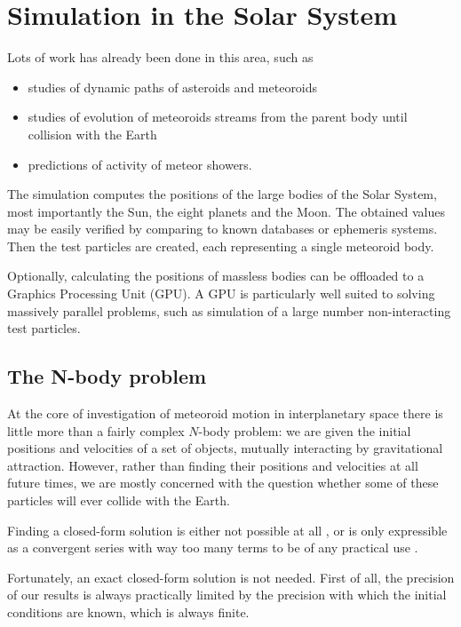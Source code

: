 \section{Simulation in the Solar System} \label{ms}
    Lots of work has already been done in this area, such as
    \begin{itemize}
        \item studies of dynamic paths of asteroids and meteoroids
        \item studies of evolution of meteoroids streams from the parent body until collision with the Earth
        \item predictions of activity of meteor showers.
    \end{itemize}

    The simulation computes the positions of the large bodies of the Solar System, most importantly the Sun,
    the eight planets and the Moon. The obtained values may be easily verified by comparing to known databases
    or ephemeris systems.
    Then the test particles are created, each representing a single meteoroid body.

    Optionally, calculating the positions of massless bodies can be offloaded to a Graphics Processing Unit (GPU).
    A GPU is particularly well suited to solving massively parallel problems,
    such as simulation of a large number non-interacting test particles.

    \subsection{The N-body problem} \label{msN}
        At the core of investigation of meteoroid motion in interplanetary space
        there is little more than a fairly complex $N$-body problem:
        we are given the initial positions and velocities of a set of objects,
        mutually interacting by gravitational attraction.
        However, rather than finding their positions and velocities at all future times, we are mostly concerned
        with the question whether some of these particles will ever collide with the Earth.

        Finding a closed-form solution is either not possible at all \cite{...}, or is only expressible
        as a convergent series with way too many terms to be of any practical use \citep{beloriszky-1930}.

        Fortunately, an exact closed-form solution is not needed. First of all, the precision of our results
        is always practically limited by the precision with which the initial conditions are known,
        which is always finite.

